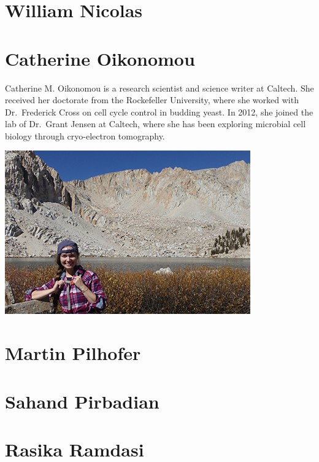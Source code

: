\documentclass[]{tufte-book}
\begin{document}
\hypertarget{william_nicolas}{\section*{William
Nicolas}\label{william_nicolas}}

\section*{Catherine Oikonomou}\label{catherine_oikonomou}

Catherine M. Oikonomou is a research scientist and science writer at
Caltech. She received her doctorate from the Rockefeller University,
where she worked with Dr.~Frederick Cross on cell cycle control in
budding yeast. In 2012, she joined the lab of Dr.~Grant Jensen at
Caltech, where she has been exploring microbial cell biology through
cryo-electron tomography.

\includegraphics{img/bios/catherine_oikonomou}

\hypertarget{martin_pilhofer}{\section*{Martin
Pilhofer}\label{martin_pilhofer}}

\hypertarget{sahand_pirbadian}{\section*{Sahand
Pirbadian}\label{sahand_pirbadian}}

\hypertarget{rasika_ramdasi}{\section*{Rasika
Ramdasi}\label{rasika_ramdasi}}
\end{document}
